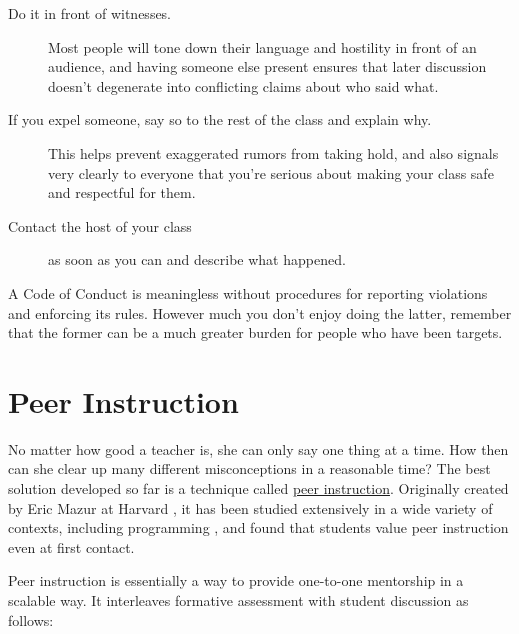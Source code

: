 \begin{description}

\item[Do it in front of witnesses.]
Most people will tone down their language and hostility in front of
an audience, and having someone else present ensures that later
discussion doesn't degenerate into conflicting claims about who said
what.

\item[If you expel someone, say so to the rest of the class and explain why.]
This helps prevent exaggerated rumors from taking hold, and
also signals very clearly to everyone that you're serious about
making your class safe and respectful for them.

\item[Contact the host of your class]
as soon as you can and describe what happened.

\end{description}

A Code of Conduct is meaningless without procedures for reporting
violations and enforcing its rules. However much you don't enjoy doing
the latter, remember that the former can be a much greater burden for
people who have been targets.

\section{Peer Instruction}\label{s:classroom-peer}

No matter how good a teacher is, she can only say one thing at a time.
How then can she clear up many different misconceptions in a reasonable
time? The best solution developed so far is a technique called
\protect\hyperlink{g:peer-instruction}{peer instruction}. Originally created
by Eric Mazur at Harvard \cite{Mazu1996}, it has been studied
extensively in a wide variety of contexts, including programming
\cite{Crou2001,Port2013}, and \cite{Port2016} found that students
value peer instruction even at first contact.

Peer instruction is essentially a way to provide one-to-one mentorship
in a scalable way. It interleaves formative assessment with student
discussion as follows:

